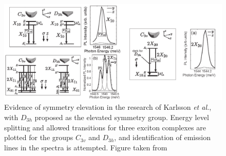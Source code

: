 \begin{figure}
\begin{center}
\includegraphics[width=\textwidth]{figures/karlsson_elevation_evidence}
\caption{Evidence of symmetry elevation in the research of Karlsson \textit{et al.}, with $D_{3h}$ proposed as the elevated symmetry group. Energy level splitting and allowed transitions for three exciton complexes are plotted for the groups $C_{3v}$ and $D_{3h}$, and identification of emission lines in the spectra is attempted. Figure taken from \cite[Fig. 14, 15, 16]{karlsson} \label{fig:karlsson_elevation_evidence}}
\end{center}
\end{figure}

